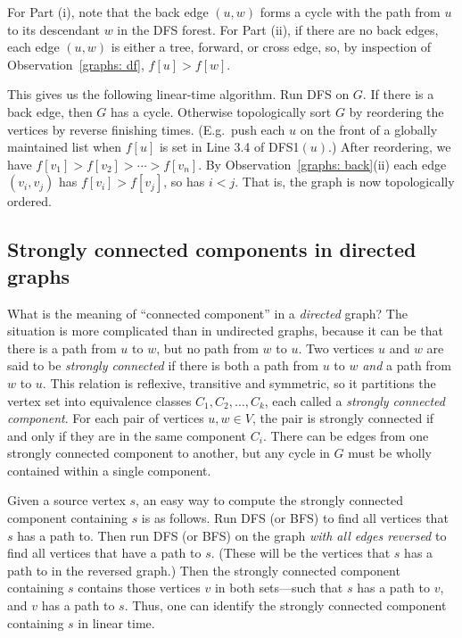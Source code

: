 \documentclass[11pt]{article}
\begin{document}
For Part (i), note that the back edge $(u,w)$ forms a cycle
with the path from $u$ to its descendant $w$ in the DFS forest.
For Part (ii), 
if there are no back edges, each edge $(u,w)$ is either a tree, forward, or cross edge,
so, by inspection of Observation~\ref{graphs: df}, $f[u] > f[w]$.

This gives us the following linear-time algorithm.
Run DFS on $G$.
If there is a back edge, then $G$ has a cycle.
Otherwise topologically sort $G$ by reordering the vertices by reverse finishing times.
(E.g.~push each $u$ on the front of a globally maintained list
when $f[u]$ is set in Line 3.4 of \textsf{DFS1}$(u)$.)
After reordering, we have $f[v_1] > f[v_2] > \cdots > f[v_n]$.
By Observation~\ref{graphs: back}(ii) each edge $(v_i, v_j)$ has $f[v_i]  > f[v_j]$, so has $i < j$.
That is, the graph is now topologically ordered.


\subsection{Strongly connected components in directed graphs} 
What is the meaning of ``connected component'' in a \emph{directed} graph?
The situation is more complicated than in undirected graphs,
because it can be that there is a path from $u$ to $w$,
but no path from $w$ to $u$.
Two vertices $u$ and $w$ are said to be \emph{strongly connected}
if there is both a path from $u$ to $w$ \emph{and} a path from $w$ to $u$.
This relation is reflexive, transitive and symmetric,
so it partitions the vertex set into equivalence classes
$C_1, C_2, \ldots, C_k$,
each called a \emph{strongly connected component}.
For each pair of vertices $u, w\in V$, the pair is strongly connected
if and only if they are in the same component $C_i$.
There can be edges from one strongly connected component to another,
but any cycle in $G$ must be wholly contained within a single component.

Given a source vertex $s$, an easy way to compute the strongly connected component containing $s$
is as follows.  Run DFS (or BFS) to find all vertices that $s$ has a path to.
Then run DFS (or BFS) on the graph \emph{with all edges reversed} to find all vertices that have a path to $s$.
(These will be the vertices that $s$ has a path to in the reversed graph.)
Then the strongly connected component containing $s$
contains those vertices $v$ in both sets---such that $s$ has a path to $v$, and $v$ has a path to $s$.
Thus, one can identify the strongly connected component containing $s$ in linear time.
\end{document}
